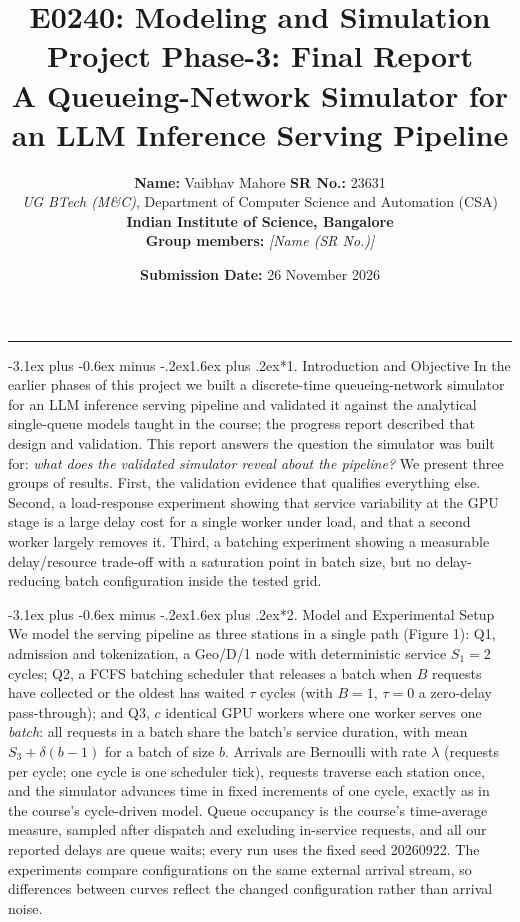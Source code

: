 \documentclass[11pt,a4paper]{article}
\title{\vspace{-2.2em}\textbf{\huge E0240: Modeling and Simulation}\\[0.4em]
\Large \textbf{Project Phase-3: Final Report}\\[0.3em]
\large A Queueing-Network Simulator for an LLM Inference Serving Pipeline}
\author{\textbf{Name:} Vaibhav Mahore \quad \textbf{SR No.:} 23631\\[0.2em]
\textit{UG BTech (M\&C)}, Department of Computer Science and Automation (CSA)\\[0.2em]
\textbf{Indian Institute of Science, Bangalore}\\[0.2em]
\textbf{Group members:} \textit{[Name (SR No.)] \quad [Name (SR No.)]}}
\date{\textbf{Submission Date:} 26 November 2026}
\makeatletter
\renewcommand\section{\@startsection{section}{1}{\z@}%
  {-3.1ex plus -0.6ex minus -.2ex}{1.6ex plus .2ex}{\normalfont\Large\bfseries}}
\makeatother
\begin{document}
\maketitle
\vspace{-0.4em}
\hrule
\vspace{1.2em}

\section*{1. Introduction and Objective}
In the earlier phases of this project we built a discrete-time queueing-network
simulator for an LLM inference serving pipeline and validated it against the
analytical single-queue models taught in the course; the progress report
described that design and validation. This report answers the question the
simulator was built for: \emph{what does the validated simulator reveal about
the pipeline?} We present three groups of results. First, the validation
evidence that qualifies everything else. Second, a load-response experiment
showing that service variability at the GPU stage is a large delay cost for a
single worker under load, and that a second worker largely removes it.
Third, a batching experiment showing a measurable delay/resource trade-off
with a saturation point in batch size, but no delay-reducing batch
configuration inside the tested grid.

\section*{2. Model and Experimental Setup}
We model the serving pipeline as three stations in a single path (Figure 1):
Q1, admission and tokenization, a Geo/D/1 node with deterministic service
$S_1 = 2$ cycles; Q2, a FCFS batching scheduler that releases a batch when
$B$ requests have collected or the oldest has waited $\tau$ cycles (with
$B=1$, $\tau=0$ a zero-delay pass-through); and Q3, $c$ identical GPU
workers where one worker serves one \emph{batch}: all requests in a batch
share the batch's service duration, with mean $S_3 + \delta(b-1)$ for a
batch of size $b$. Arrivals are Bernoulli with rate $\lambda$ (requests per
cycle; one cycle is one scheduler tick), requests traverse each station once,
and the simulator advances time in fixed increments of one cycle, exactly as
in the course's cycle-driven model. Queue occupancy is the course's
time-average measure, sampled after dispatch and excluding in-service
requests, and all our reported delays are queue waits; every run uses the
fixed seed 20260922. The experiments compare configurations on the same
external arrival stream, so differences between curves reflect the changed
configuration rather than arrival noise.
\end{document}
